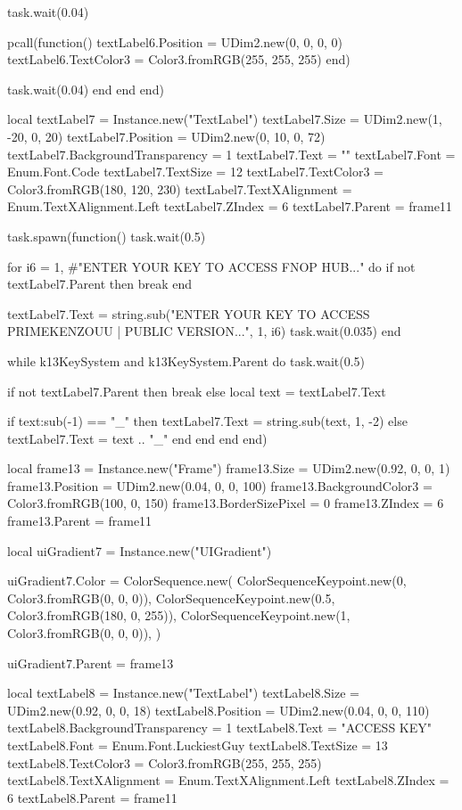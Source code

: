         task.wait(0.04)

        pcall(function()
          textLabel6.Position = UDim2.new(0, 0, 0, 0)
          textLabel6.TextColor3 = Color3.fromRGB(255, 255, 255)
        end)

        task.wait(0.04)
      end
    end
  end)

  local textLabel7 = Instance.new("TextLabel")
  textLabel7.Size = UDim2.new(1, -20, 0, 20)
  textLabel7.Position = UDim2.new(0, 10, 0, 72)
  textLabel7.BackgroundTransparency = 1
  textLabel7.Text = ""
  textLabel7.Font = Enum.Font.Code
  textLabel7.TextSize = 12
  textLabel7.TextColor3 = Color3.fromRGB(180, 120, 230)
  textLabel7.TextXAlignment = Enum.TextXAlignment.Left
  textLabel7.ZIndex = 6
  textLabel7.Parent = frame11

  task.spawn(function()
    task.wait(0.5)

    for i6 = 1, #"ENTER YOUR KEY TO ACCESS FNOP HUB..." do
      if not textLabel7.Parent then
        break
      end

      textLabel7.Text = string.sub("ENTER YOUR KEY TO ACCESS PRIMEKENZOUU | PUBLIC VERSION...", 1, i6)
      task.wait(0.035)
    end

    while k13KeySystem and k13KeySystem.Parent do
      task.wait(0.5)

      if not textLabel7.Parent then
        break
      else
        local text = textLabel7.Text

        if text:sub(-1) == "_" then
          textLabel7.Text = string.sub(text, 1, -2)
        else
          textLabel7.Text = text .. "_"
        end
      end
    end
  end)

  local frame13 = Instance.new("Frame")
  frame13.Size = UDim2.new(0.92, 0, 0, 1)
  frame13.Position = UDim2.new(0.04, 0, 0, 100)
  frame13.BackgroundColor3 = Color3.fromRGB(100, 0, 150)
  frame13.BorderSizePixel = 0
  frame13.ZIndex = 6
  frame13.Parent = frame11

  local uiGradient7 = Instance.new("UIGradient")

  uiGradient7.Color = ColorSequence.new({
    ColorSequenceKeypoint.new(0, Color3.fromRGB(0, 0, 0)),
    ColorSequenceKeypoint.new(0.5, Color3.fromRGB(180, 0, 255)),
    ColorSequenceKeypoint.new(1, Color3.fromRGB(0, 0, 0)),
  })

  uiGradient7.Parent = frame13

  local textLabel8 = Instance.new("TextLabel")
  textLabel8.Size = UDim2.new(0.92, 0, 0, 18)
  textLabel8.Position = UDim2.new(0.04, 0, 0, 110)
  textLabel8.BackgroundTransparency = 1
  textLabel8.Text = "ACCESS KEY"
  textLabel8.Font = Enum.Font.LuckiestGuy
  textLabel8.TextSize = 13
  textLabel8.TextColor3 = Color3.fromRGB(255, 255, 255)
  textLabel8.TextXAlignment = Enum.TextXAlignment.Left
  textLabel8.ZIndex = 6
  textLabel8.Parent = frame11

